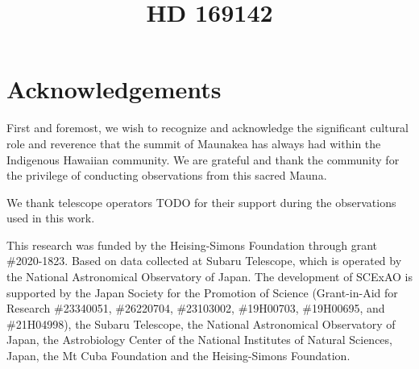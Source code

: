 \documentclass[twocolumn]{aastex631}
\begin{document}
\title{HD 169142}



\begin{abstract}
\end{abstract}




\section*{Acknowledgements}
First and foremost, we wish to recognize and acknowledge the significant cultural role and reverence that the summit of Maunakea has always had within the Indigenous Hawaiian community. We are grateful and thank the community for the privilege of conducting observations from this sacred Mauna.

We thank telescope operators TODO for their support during the observations used in this work.

This research was funded by the Heising-Simons Foundation through grant \#2020-1823. Based on data collected at Subaru Telescope, which is operated by the National Astronomical Observatory of Japan. The development of SCExAO is supported by the Japan Society for the Promotion of Science (Grant-in-Aid for Research \#23340051, \#26220704, \#23103002, \#19H00703, \#19H00695, and \#21H04998), the Subaru Telescope, the National Astronomical Observatory of Japan, the Astrobiology Center of the National Institutes of Natural Sciences, Japan, the Mt Cuba Foundation and the Heising-Simons Foundation.


\end{document}
